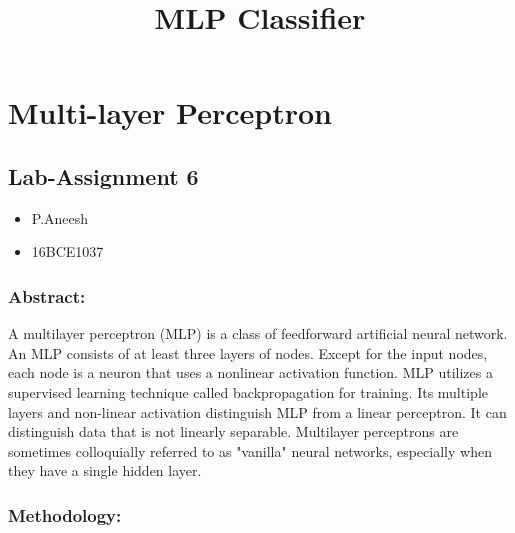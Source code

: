 \documentclass[11pt]{article}
\title{MLP Classifier}
\providecommand{\tightlist}{%
      \setlength{\itemsep}{0pt}\setlength{\parskip}{0pt}}
\begin{document}
    
    
    \maketitle
    
    

    
    \section{Multi-layer Perceptron}\label{multi-layer-perceptron}

\subsection{Lab-Assignment 6}\label{lab-assignment-6}

\begin{itemize}
\tightlist
\item
  P.Aneesh
\item
  16BCE1037
\end{itemize}

\subsubsection{Abstract:}\label{abstract}

A multilayer perceptron (MLP) is a class of feedforward artificial
neural network. An MLP consists of at least three layers of nodes.
Except for the input nodes, each node is a neuron that uses a nonlinear
activation function. MLP utilizes a supervised learning technique called
backpropagation for training. Its multiple layers and non-linear
activation distinguish MLP from a linear perceptron. It can distinguish
data that is not linearly separable. Multilayer perceptrons are
sometimes colloquially referred to as "vanilla" neural networks,
especially when they have a single hidden layer.

\subsubsection{Methodology:}\label{methodology}
\end{document}
